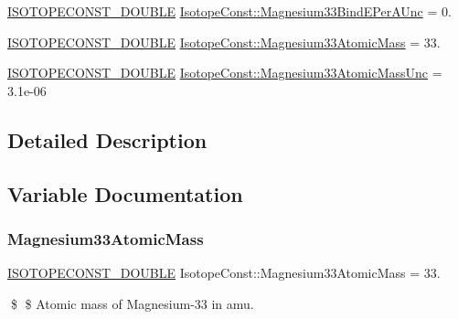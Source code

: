 \begin{DoxyCompactItemize}
\mbox{\hyperlink{group___isotope_const-_macros_ga8f45a7272ce02c0b4c65c44636ed719a}{I\+S\+O\+T\+O\+P\+E\+C\+O\+N\+S\+T\+\_\+\+D\+O\+U\+B\+LE}} \mbox{\hyperlink{group___isotope_const-_magnesium-_mg33_gaf622dac7b286cb1befe76c9b9baba5b6}{Isotope\+Const\+::\+Magnesium33\+Bind\+E\+Per\+A\+Unc}} = 0.
\item 
\mbox{\hyperlink{group___isotope_const-_macros_ga8f45a7272ce02c0b4c65c44636ed719a}{I\+S\+O\+T\+O\+P\+E\+C\+O\+N\+S\+T\+\_\+\+D\+O\+U\+B\+LE}} \mbox{\hyperlink{group___isotope_const-_magnesium-_mg33_gaf412e0a98a56977157ece7647a1c2f70}{Isotope\+Const\+::\+Magnesium33\+Atomic\+Mass}} = 33.
\item 
\mbox{\hyperlink{group___isotope_const-_macros_ga8f45a7272ce02c0b4c65c44636ed719a}{I\+S\+O\+T\+O\+P\+E\+C\+O\+N\+S\+T\+\_\+\+D\+O\+U\+B\+LE}} \mbox{\hyperlink{group___isotope_const-_magnesium-_mg33_ga35325bba4f78e4e4d98a6a81caedc6c5}{Isotope\+Const\+::\+Magnesium33\+Atomic\+Mass\+Unc}} = 3.\+1e-\/06
\end{DoxyCompactItemize}


\subsection{Detailed Description}


\subsection{Variable Documentation}
\mbox{\label{group___isotope_const-_magnesium-_mg33_gaf412e0a98a56977157ece7647a1c2f70}} 
\subsubsection{\texorpdfstring{Magnesium33\+Atomic\+Mass}{Magnesium33AtomicMass}}
{\footnotesize\ttfamily \mbox{\hyperlink{group___isotope_const-_macros_ga8f45a7272ce02c0b4c65c44636ed719a}{I\+S\+O\+T\+O\+P\+E\+C\+O\+N\+S\+T\+\_\+\+D\+O\+U\+B\+LE}} Isotope\+Const\+::\+Magnesium33\+Atomic\+Mass = 33.}

\$ \$ Atomic mass of Magnesium-\/33 in amu. \mbox{\label{group___isotope_const-_magnesium-_mg33_ga35325bba4f78e4e4d98a6a81caedc6c5}} 
